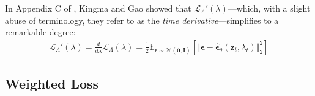 \documentclass[ oneside,%
                    author={George Herbert},
                    degree={MSci},
                     title={Diffusion Models for Time-Evolving Precipitation Fields},
                  subtitle={}]{dissertation}
\begin{document}
In Appendix C of \cite{Understanding_Diffusion_Objective_Kingma}, Kingma and Gao showed that $\mathcal{L}_\Lambda'(\lambda)$---which, with a slight abuse of terminology, they refer to as the \textit{time derivative}---simplifies to a remarkable degree:
\begin{align}
      \mathcal{L}_{\Lambda}'(\lambda)=\frac{d}{d\lambda}\mathcal{L}_\Lambda(\lambda)=\frac{1}{2}\mathbb{E}_{\boldsymbol\epsilon\sim\mathcal{N}(\mathbf{0}, \mathbf{I})}\left[\Vert \boldsymbol\epsilon -\hat{\boldsymbol\epsilon}_\theta(\mathbf{z}_t,\lambda_t)\Vert_2^2\right]\label{eq:time_derivative}
\end{align} 

\subsection{Weighted Loss}
\label{sec:background_diffusion_weighted_loss}
\end{document}
